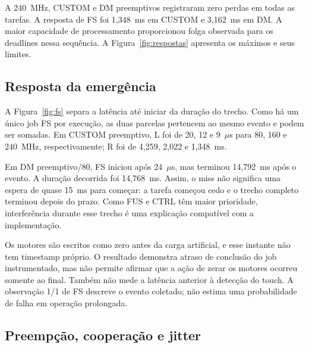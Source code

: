 A 240~MHz, CUSTOM e DM preemptivos registraram zero perdas em todas as tarefas. A resposta de FS foi 1,348~ms em CUSTOM e 3,162~ms em DM. A maior capacidade de processamento proporcionou folga observada para os deadlines nessa sequência. A Figura~\ref{fig:respostas} apresenta os máximos e seus limites.


\subsection{Resposta da emergência}

A Figura~\ref{fig:fs} separa a latência até iniciar da duração do trecho. Como há um único job FS por execução, as duas parcelas pertencem ao mesmo evento e podem ser somadas. Em CUSTOM preemptivo, L foi de 20, 12 e 9~$\mu$s para 80, 160 e 240~MHz, respectivamente; R foi de 4,259, 2,022 e 1,348~ms.

Em DM preemptivo/80, FS iniciou após 24~$\mu$s, mas terminou 14,792~ms após o evento. A duração decorrida foi 14,768~ms. Assim, o miss não significa uma espera de quase 15~ms para começar: a tarefa começou cedo e o trecho completo terminou depois do prazo. Como FUS e CTRL têm maior prioridade, interferência durante esse trecho é uma explicação compatível com a implementação.

Os motores são escritos como zero antes da carga artificial, e esse instante não tem timestamp próprio. O resultado demonstra atraso de conclusão do job instrumentado, mas não permite afirmar que a ação de zerar os motores ocorreu somente ao final. Também não mede a latência anterior à detecção do touch. A observação 1/1 de FS descreve o evento coletado; não estima uma probabilidade de falha em operação prolongada.


\subsection{Preempção, cooperação e jitter}

